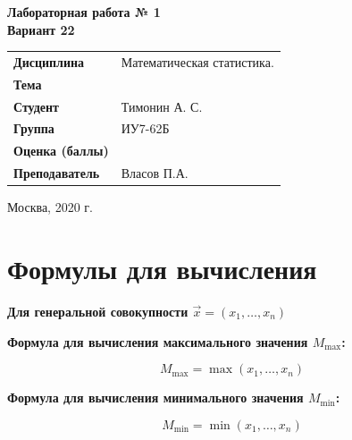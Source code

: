 \documentclass[12pt, a4paper]{report}
\begin{document}
\begin{titlepage}
		\vspace{2cm}
		
		\begin{center}
			\textbf{Лабораторная работа № 1} \\
			\vspace{0.5cm}
			\textbf{Вариант 22}
		\end{center}
		
		\vspace{4cm}
		
		\begin{flushleft}
			\begin{tabular}{ll}
				\textbf{Дисциплина} & Математическая статистика. \\
				\textbf{Тема} & \\
				\textbf{Студент} & Тимонин А. С. \\
				\textbf{Группа} & ИУ7-62Б \\
				\textbf{Оценка (баллы)} & \\
				\textbf{Преподаватель} & Власов П.А. \\
			\end{tabular}
		\end{flushleft}
		
		\vspace{6cm}
		
		\begin{center}
			Москва, 2020 г.
		\end{center}
		
		
	\end{titlepage}
	
	
	\section{Формулы для вычисления}
	
	\hspace{0.7cm}\textbf{Для генеральной совокупности $\vec{x} = {(x_1, \dots, x_n)}$}
	
	\vspace{0.5cm}\textbf{Формула для вычисления максимального значения $M_{\max}$:}
	
	\begin{equation*} \label{Mmax}
	M_{\max} = \max{(x_1, \dots, x_n)}
	\end{equation*}
	
	\textbf{Формула для вычисления минимального значения $M_{\min}$:}
	
	\begin{equation*} \label{Mmin}
	M_{\min} = \min{(x_1, \dots, x_n)}
	\end{equation*}
	
\end{document}
